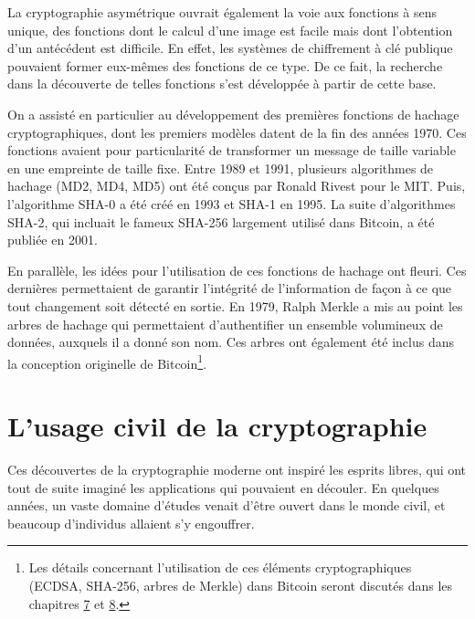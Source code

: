 \documentclass[
  a5paper,
  smalldemyvopaper,10pt,twoside,onecolumn,openright,extrafontsizes,hidelinks]{memoir}
\begin{document}
La cryptographie asymétrique ouvrait également la voie aux fonctions à
sens unique, des fonctions dont le calcul d'une image est facile mais
dont l'obtention d'un antécédent est difficile. En effet, les systèmes
de chiffrement à clé publique pouvaient former eux-mêmes des fonctions
de ce type. De ce fait, la recherche dans la découverte de telles
fonctions s'est développée à partir de cette base.

On a assisté en particulier au développement des premières fonctions de
hachage cryptographiques, dont les premiers modèles datent de la fin des
années 1970. Ces fonctions avaient pour particularité de transformer un
message de taille variable en une empreinte de taille fixe. Entre 1989
et 1991, plusieurs algorithmes de hachage (MD2, MD4, MD5) ont été conçus
par Ronald Rivest pour le MIT. Puis, l'algorithme SHA-0 a été créé en
1993 et SHA-1 en 1995. La suite d'algorithmes SHA-2, qui incluait le
fameux SHA-256 largement utilisé dans Bitcoin, a été publiée en 2001.

En parallèle, les idées pour l'utilisation de ces fonctions de hachage
ont fleuri. Ces dernières permettaient de garantir l'intégrité de
l'information de façon à ce que tout changement soit détecté en sortie.
En 1979, Ralph Merkle a mis au point les arbres de hachage qui
permettaient d'authentifier un ensemble volumineux de données, auxquels
il a donné son nom. Ces arbres ont également été inclus dans la
conception originelle de Bitcoin\footnote{Les détails concernant
  l'utilisation de ces éléments cryptographiques (ECDSA, SHA-256, arbres
  de Merkle) dans Bitcoin seront discutés dans les chapitres
  \hyperref[ch:propriete]{7} et \hyperref[ch:confirmation]{8}.}.

\section*{L'usage civil de la
cryptographie}\label{lusage-civil-de-la-cryptographie}


Ces découvertes de la cryptographie moderne ont inspiré les esprits
libres, qui ont tout de suite imaginé les applications qui pouvaient en
découler. En quelques années, un vaste domaine d'études venait d'être
ouvert dans le monde civil, et beaucoup d'individus allaient s'y
engouffrer.
\end{document}
